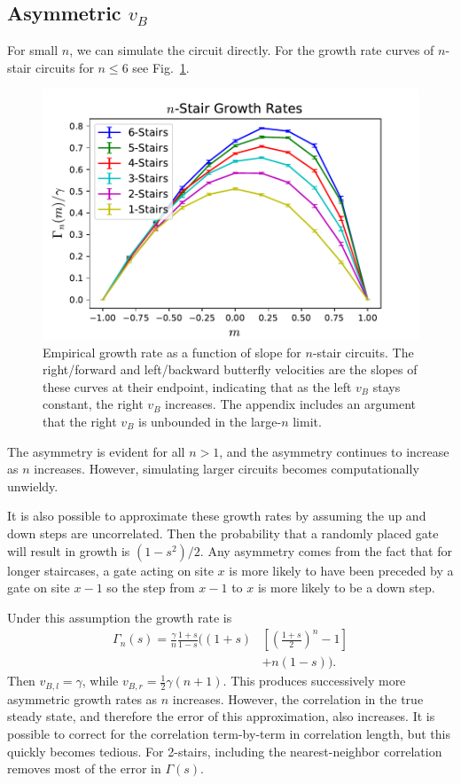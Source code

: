 \documentclass[aps,prx,reprint,superscriptaddress, longbibliography]{revtex4-1}
\newcommand{\half}{\frac{1}{2}}
\begin{document}
\subsection{Asymmetric $v_B$}

For small $n$, we can simulate the circuit directly. For the growth rate curves of $n$-stair circuits for $n\le 6$ see Fig.~\ref{fig:compareRates}. 
\begin{figure}
	\includegraphics[width=\columnwidth]{compareRates.pdf}
	\caption{Empirical growth rate as a function of slope for $n$-stair circuits. The right/forward and left/backward butterfly velocities are the slopes of these curves at their endpoint, indicating that as the left $v_B$ stays constant, the right $v_B$ increases. The appendix includes an argument that the right $v_B$ is unbounded in the large-$n$ limit.}
	\label{fig:compareRates}
\end{figure}
The asymmetry is evident for all $n>1$, and the asymmetry continues to increase as $n$ increases. However, simulating larger circuits becomes computationally unwieldy.
	
It is also possible to approximate these growth rates by assuming the up and down steps are uncorrelated. Then the probability that a randomly placed gate will result in growth is $(1-s^2)/2$. Any asymmetry comes from the fact that for longer staircases, a gate acting on site $x$ is more likely to have been preceded by a gate on site $x-1$ so the step from $x-1$ to $x$ is more likely to be a down step.

Under this assumption the growth rate is
\begin{align}
\Gamma_n(s) = \frac{\gamma}{n}\frac{1+s}{1-s}\bigg(
	(1+s)&\left[\left(\frac{1+s}{2}\right)^n-1\right]\nonumber \\
	&+n(1-s)\bigg). \label{eqn:growthrate}
\end{align}
Then $v_{B,l}=\gamma$, while $v_{B,r}=\half\gamma(n+1)$.
This produces successively more asymmetric growth rates as $n$ increases. However, the correlation in the true steady state, and therefore the error of this approximation, also increases. It is possible to correct for the correlation term-by-term in correlation length, but this quickly becomes tedious. For 2-stairs, including the nearest-neighbor correlation removes most of the error in $\Gamma(s)$.
\end{document}
